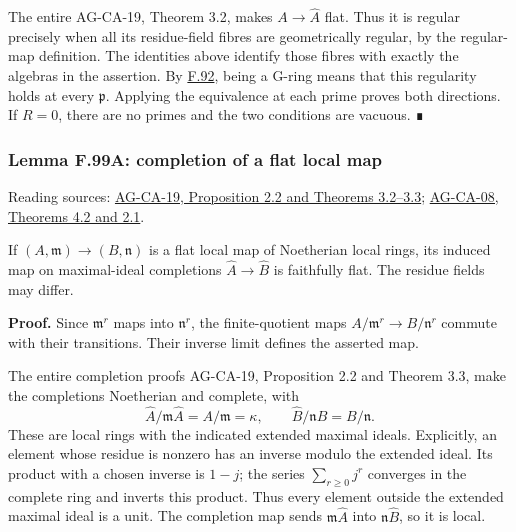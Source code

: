 \documentclass[11pt,a4paper,openany]{report}
\begin{document}
The entire AG-CA-19, Theorem 3.2, makes \(A\to\widehat A\) flat. Thus it is regular precisely when all its residue-field fibres are geometrically regular, by the regular-map definition. The identities above identify those fibres with exactly the algebras in the assertion. By \hyperref[AG-RG-S05-more-algebra-definition-G-ring]{F.92}, being a G-ring means that this regularity holds at every \(\mathfrak p\). Applying the equivalence at each prime proves both directions. If \(R=0\), there are no primes and the two conditions are vacuous. ∎

\label{AG-RG-S05-completion-flat-local-map}

\subsubsection{Lemma F.99A: completion of a flat local map}\label{AG-RG-S05-lemma-f.99a-completion-of-a-flat-local-map}

Reading sources: \href{https://github.com/KokunoYumeto/open-math-courses/blob/d02d0a3669f42579db037cd44de1d113fdd770a1/docs/courses/AG-CA/src/completion.md}{AG-CA-19, Proposition 2.2 and Theorems 3.2--3.3}; \href{https://github.com/KokunoYumeto/open-math-courses/blob/d02d0a3669f42579db037cd44de1d113fdd770a1/docs/courses/AG-CA/src/faithful-flatness-and-the-local-criterion-for-flatness.md}{AG-CA-08, Theorems 4.2 and 2.1}.

If \((A,\mathfrak m)\to(B,\mathfrak n)\) is a flat local map of Noetherian local rings, its induced map on maximal-ideal completions \(\widehat A\to\widehat B\) is faithfully flat. The residue fields may differ.

\textbf{Proof.} Since \(\mathfrak m^r\) maps into \(\mathfrak n^r\), the finite-quotient maps \(A/\mathfrak m^r\to B/\mathfrak n^r\) commute with their transitions. Their inverse limit defines the asserted map.

The entire completion proofs AG-CA-19, Proposition 2.2 and Theorem 3.3, make the completions Noetherian and complete, with \[\widehat A/\mathfrak m\widehat A=A/\mathfrak m=\kappa,
\qquad \widehat B/\mathfrak n\widehat B=B/\mathfrak n.\] These are local rings with the indicated extended maximal ideals. Explicitly, an element whose residue is nonzero has an inverse modulo the extended ideal. Its product with a chosen inverse is \(1-j\); the series \(\sum_{r\geq0}j^r\) converges in the complete ring and inverts this product. Thus every element outside the extended maximal ideal is a unit. The completion map sends \(\mathfrak m\widehat A\) into \(\mathfrak n\widehat B\), so it is local.
\end{document}
